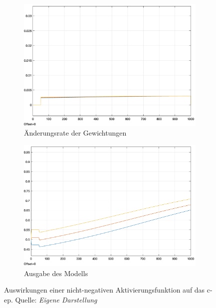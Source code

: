 \begin{figure}[h]
  \centering
  \begin{subfigure}[b]{0.5\textwidth}
    \includegraphics[width=\textwidth]{abbildungen/c_ep_non_negative_activation_weight_update.png}
    \caption{Änderungsrate der Gewichtungen}
  \end{subfigure}%
  \hfill
  \begin{subfigure}[b]{0.5\textwidth}
    \includegraphics[width=\textwidth]{abbildungen/c_ep_non_negative_activation_ausgabe.png}
    \caption{Ausgabe des Modells}
  \end{subfigure}
  \caption{Auswirkungen einer nicht-negativen Aktivierungsfunktion auf das \gls{c-ep}. Quelle: \textit{Eigene Darstellung}}
  \label{fig:C-EP Non-Negative Aktivierungsfunktion}
\end{figure}

